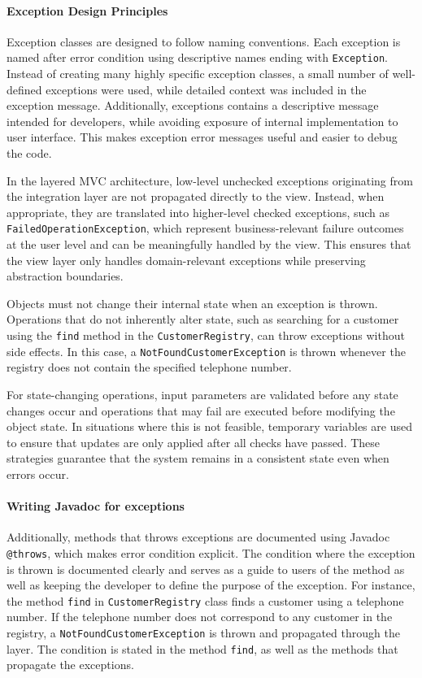 \documentclass[a4paper]{scrartcl}
\begin{document}
\paragraph{Exception Design Principles}

Exception classes are designed to follow naming conventions. Each exception is named after error condition using descriptive names ending with \texttt{Exception}. Instead of creating many highly specific exception classes, a small number of well-defined exceptions were used, while detailed context was included in the exception message. Additionally, exceptions contains a descriptive message intended for developers, while avoiding exposure of internal implementation to user interface. This makes exception error messages useful and easier to debug the code.

In the layered MVC architecture, low-level unchecked exceptions originating from the integration layer are not propagated directly to the view. Instead, when appropriate, they are translated into higher-level checked exceptions, such as \texttt{FailedOperationException}, which represent business-relevant failure outcomes at the user level and can be meaningfully handled by the view. This ensures that the view layer only handles domain-relevant exceptions while preserving abstraction boundaries.

Objects must not change their internal state when an exception is thrown. Operations that do not inherently alter state, such as searching for a customer using the \texttt{find} method in the \texttt{CustomerRegistry}, can throw exceptions without side effects. In this case, a \texttt{NotFoundCustomerException} is thrown whenever the
registry does not contain the specified telephone number.

For state-changing operations, input parameters are validated before any state changes occur and operations that may fail are executed before modifying the object state. In situations where this is not feasible, temporary variables are used to ensure that updates are only applied after all checks have passed. These strategies guarantee that the system remains in a consistent state even when errors occur.

\paragraph{Writing Javadoc for exceptions}

Additionally, methods that throws exceptions are documented using Javadoc \texttt{@throws}, which makes error condition explicit. The condition where the exception is thrown is documented clearly and serves as a guide to users of the method as well as keeping the developer to define the purpose of the exception. For instance, the method \texttt{find} in \texttt{CustomerRegistry} class finds a customer using a telephone number. If the telephone number does not correspond to any customer in the registry, a \texttt{NotFoundCustomerException} is thrown and propagated through the layer. The condition is stated in the method \texttt{find}, as well as the methods that propagate the exceptions.
\end{document}
